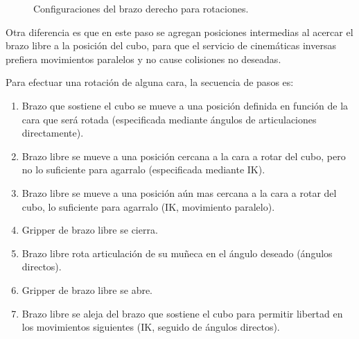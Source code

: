 \begin{figure}[h!]
	\centering
	\hfill
	\hfill
	\caption{Configuraciones del brazo derecho para rotaciones.}
	\label{mover}
\end{figure}
Otra diferencia es que en este paso se agregan posiciones intermedias al acercar el brazo libre a la posición del cubo, para que el servicio de cinemáticas inversas prefiera movimientos paralelos y no cause colisiones no deseadas.

Para efectuar una rotación de alguna cara, la secuencia de pasos es:
\begin{enumerate}
	\item Brazo que sostiene el cubo se mueve a una posición definida en función de la cara que será rotada (especificada mediante ángulos de articulaciones directamente).
	\item Brazo libre se mueve a una posición cercana a la cara a rotar del cubo, pero no lo suficiente para agarralo (especificada mediante IK).
	\item Brazo libre se mueve a una posición aún mas cercana a la cara a rotar del cubo, lo suficiente para agarralo (IK, movimiento paralelo).
	\item Gripper de brazo libre se cierra.
	\item Brazo libre rota articulación de su muñeca en el ángulo deseado (ángulos directos).
	\item Gripper de brazo libre se abre.
	\item Brazo libre se aleja del brazo que sostiene el cubo para permitir libertad en los movimientos siguientes (IK, seguido de ángulos directos).
\end{enumerate}

